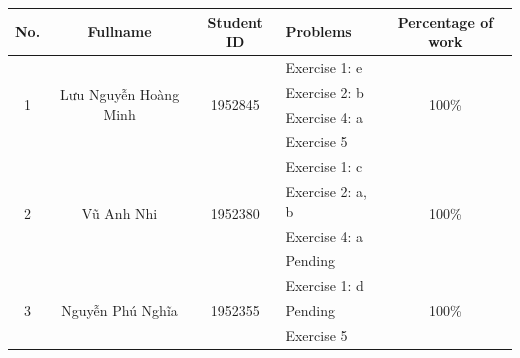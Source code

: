 \documentclass[a4paper]{article}
\begin{document}
\begin{center}
  \begin{tabular}{|c|c|c|l|c|}
    \hline
    \textbf{No.}       & \textbf{Fullname}                      & \textbf{Student ID}      & \textbf{Problems}              & \textbf{Percentage of work} \\
    \hline
    \multirow{4}{*}{1} & \multirow{4}{*}{Lưu Nguyễn Hoàng Minh} & \multirow{4}{*}{1952845} & \textendash{} Exercise 1: e    & \multirow{4}{*}{100\%}      \\
                       &                                        &                          & \textendash{} Exercise 2: b    &                             \\
                       &                                        &                          & \textendash{} Exercise 4: a    &                             \\
                       &                                        &                          & \textendash{} Exercise 5       &                             \\
    \hline
    \multirow{4}{*}{2} & \multirow{4}{*}{Vũ Anh Nhi}            & \multirow{4}{*}{1952380} & \textendash{} Exercise 1: c    & \multirow{4}{*}{100\%}      \\
                       &                                        &                          & \textendash{} Exercise 2: a, b &                             \\
                       &                                        &                          & \textendash{} Exercise 4: a    &                             \\
                       &                                        &                          & \textendash{} Pending          &                             \\
    \hline
    \multirow{4}{*}{3} & \multirow{4}{*}{Nguyễn Phú Nghĩa}      & \multirow{4}{*}{1952355} & \textendash{} Exercise 1: d    & \multirow{4}{*}{100\%}      \\
                       &                                        &                          & \textendash{} Pending          &                             \\
                       &                                        &                          & \textendash{} Exercise 5       &                             \\

\end{tabular}
\end{center}
\end{document}
